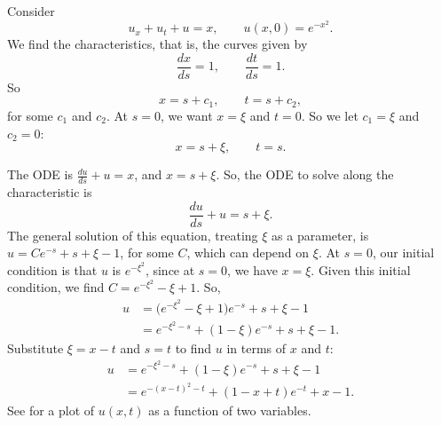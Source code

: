 \begin{example}
Consider
\begin{equation*}
u_x + u_t + u = x, \qquad u(x,0) = e^{-x^2} .
\end{equation*}
We find the characteristics, that is, the curves given by
\begin{equation*}
\frac{dx}{ds} = 1, \qquad \frac{dt}{ds} = 1 .
\end{equation*}
So
\begin{equation*}
x = s + c_1, \qquad t = s+ c_2 ,
\end{equation*}
for some $c_1$ and $c_2$.
At $s=0$, we want $x=\xi$ and $t=0$.  So
we let $c_1 = \xi$ and $c_2 = 0$:
\begin{equation*}
x = s + \xi, \qquad t = s .
\end{equation*}

The ODE is $\frac{du}{ds} + u = x$, and $x = s+\xi$. So, the ODE
to solve along the characteristic is
\begin{equation*}
\frac{du}{ds} + u = s+ \xi .
\end{equation*}
The general solution of this equation, treating $\xi$ as a parameter, is
$u = C e^{-s}+s+\xi-1$, for some $C$, which can depend on $\xi$.
At $s=0$, our initial condition is that $u$ is
$e^{-\xi^2}$, since at $s=0$, we have $x=\xi$.
Given this initial condition, we find $C=e^{-\xi^2} - \xi +1$.  So,
\begin{equation*}
\begin{split}
u & =
\bigl(e^{-\xi^2} - \xi +1\bigr) e^{-s}+s+\xi-1
\\
& =
e^{-\xi^2-s} + (1 - \xi) e^{-s} +s+\xi-1 .
\end{split}
\end{equation*}
Substitute $\xi = x-t$ and $s=t$ to find $u$ in terms of $x$ and $t$:
\begin{equation*}
\begin{split}
u
& =
e^{-\xi^2-s} + (1 - \xi) e^{-s} +s+\xi-1
\\
& =
e^{-{(x-t)}^2-t} + (1 - x + t) e^{-t} +x-1 .
\end{split}
\end{equation*}
See  for a plot of $u(x,t)$ as a function of
two variables.
\begin{myfig}
\capstart
{}
\caption{Plot of the solution $u(x,t)$ to
$u_x + u_t + u = x$,  $u(x,0) = e^{-x^2}$.\label{fopde:surfaceplot}}
\end{myfig}
\end{example}

